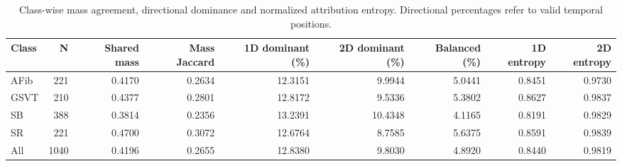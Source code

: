 \begin{table}[t]
\caption{Class-wise mass agreement, directional dominance and normalized attribution entropy. Directional percentages refer to valid temporal positions.}
\label{tab:02_classwise_extended}
\begin{tabular}{lrrrrrrrr}
\toprule
Class & N & Shared mass & Mass Jaccard & 1D dominant (\%) & 2D dominant (\%) & Balanced (\%) & 1D entropy & 2D entropy \\
\midrule
AFib & 221 & 0.4170 & 0.2634 & 12.3151 & 9.9944 & 5.0441 & 0.8451 & 0.9730 \\
GSVT & 210 & 0.4377 & 0.2801 & 12.8172 & 9.5336 & 5.3802 & 0.8627 & 0.9837 \\
SB & 388 & 0.3814 & 0.2356 & 13.2391 & 10.4348 & 4.1165 & 0.8191 & 0.9829 \\
SR & 221 & 0.4700 & 0.3072 & 12.6764 & 8.7585 & 5.6375 & 0.8591 & 0.9839 \\
All & 1040 & 0.4196 & 0.2655 & 12.8380 & 9.8030 & 4.8920 & 0.8440 & 0.9819 \\
\bottomrule
\end{tabular}
\end{table}
